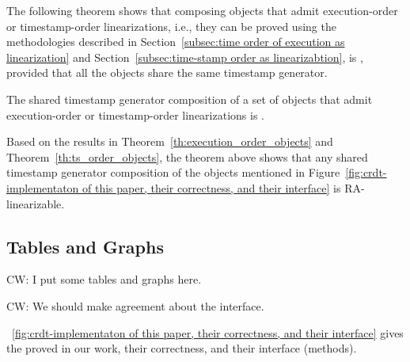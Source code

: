 The following theorem shows that composing \crdtlinearizable{} objects that admit execution-order or timestamp-order linearizations, i.e., they can be proved \crdtlinearizable{} using the methodologies described in Section~\ref{subsec:time order of execution as linearization} and Section~\ref{subsec:time-stamp order as linearizabtion}, is \crdtlinearizable{}, provided that all the objects share the same timestamp generator.

\begin{theorem}\label{th:comp_all}
The shared timestamp generator composition of a set of \crdtlinearizable{} objects that admit execution-order or timestamp-order linearizations is \crdtlinearizable{}.
\end{theorem}

Based on the results in Theorem~\ref{th:execution_order_objects} and Theorem~\ref{th:ts_order_objects}, the theorem above shows that any shared timestamp generator composition of the objects mentioned in Figure~\ref{fig:crdt-implementaton of this paper, their correctness, and their interface} is RA-linearizable.


\subsection{Tables and Graphs}
\label{lemma:tables and graphs}

{\color {red}CW: I put some tables and graphs here.}

{\color {red}CW: We should make agreement about the interface.}

\figurename~\ref{fig:crdt-implementaton of this paper, their correctness, and their interface} gives the \crdtimp{} proved in our work, their correctness, and their interface (methods).


